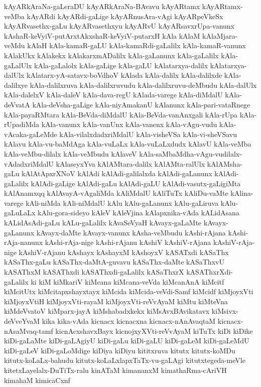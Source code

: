 {kAyARkAraNa-gaLeraDU
kAyARkAraNa-BAvavu
kAyARtamx
kAyARtamx-veMba
kAyARdi
kAyARdi-gaLige
kAyARnusAra-vAgi
kAyARpeVkeSx
kAyARvasethx-gaLu
kAyARvasethxyu
kAyARvU
kAyARsavxrUpa-vanunx
kAshaR-keVyiV-putArxtAkxshaR-keVyiV-putarxH
kAla
kAlaM
kAlaMjara-veMdu
kAlaH
kAla-kamaR-gaLU
kAla-kamaRdi-gaLalilx
kAla-kamaR-vanunx
kAlakUkx
kAlakekx
kAlakarxmADalilx
kAla-gaLanunx
kAla-gaLalilx
kAla-gaLalUlx
kAla-gaLalolx
kAla-gaLige
kAla-gaLU
kAlatarxya-dalilx
kAlatarxya-dalUlx
kAlatarx-yA-satavx-boVdhoV
kAlada
kAla-dalilx
kAla-dalilxde
kAla-dalilxye
kAla-dalilxruva
kAla-dalilxruvudu
kAla-dalilxruvu-deMbudu
kAla-dalUlx
kAla-dalelxV
kAla-daleV
kAla-dava-regU
kAlada-varege
kAla-diMdalU
kAla-deVvatA
kAla-deVsha-gaLige
kAla-niyAmakanU
kAlanunx
kAla-pari-vataRnege
kAla-payaRMtara
kAla-BeVda-diMdalU
kAla-BeVda-vanAnxgali
kAla-rUpa
kAla-rUpadiMda
kAla-vanunx
kAla-vanUnx
kAla-vanenx
kAla-vAgu-vudu
kAla-vAcaka-gaLeMde
kAla-vilalxdadxriMdalU
kAla-visheVSa
kAla-vi-sheVSavu
kAlavu
kAla-vu-baMdAga
kAla-vuLaLx
kAla-vuLaLxdudx
kAlavU
kAla-veMba
kAla-veMbu-dilalx
kAla-veMbudu
kAlaveV
kAla-saMbaMdha-vAgu-vudilalx-vAdadxriMdalU
kAlaseyxYva
kAlAMtara-dalilx
kAlAMta-ralUlx
kAlAMsha-gaLu
kAlAtApxrXNoV
kAlAdi
kAlAdi-galilalxda
kAlAdi-gaLanunx
kAlAdi-gaLalilx
kAlAdi-gaLige
kAlAdi-gaLu
kAlAdi-gaLU
kAlAdi-vasutx-gaLigiMta
kAlAnamxqq
kAlAvayA-vAgaliMda
kAliMdalU
kAliTuTx
kAliDu-vaMte
kAlina-varege
kAli-niMda
kAli-niMdalU
kAlu
kAlu-gaLanunx
kAlu-gaLiruva
kAlu-gaLuLaLx
kAlu-gora-sideyo
kAleV
kAleVjina
kAlapxnika-vAda
kALidAsana
kALidAsAdi-gaLu
kALu-gaLalilx
kAvaSeVyaH
kAvayx-gaLaMte
kAvayx-gaLanunx
kAvayx-daMte
kAvayx-vanunx
kAsha-veMbudu
kAshi-rAjana
kAshi-rAja-nanunx
kAshi-rAja-nige
kAshi-rAjanu
kAshiV
kAshiV-rAjana
kAshiV-rAja-nige
kAshiV-rAjanu
kAshayx
kAshayxM
kAshoyxV
kASATxdi
kASaThx
kASaThx-gaLu
kASaThx-daMtA-guvavu
kASaThx-daMte
kASaThxvU
kASAThxM
kASAThxdi
kASAThxdi-gaLalilx
kASaThxrX
kASAThxrXdi-gaLalilx
ki
kiM
kiMkariV
kiMcana
kiMcana-veVda
kiMcanAnA
kiMcitf
kiMcitUtx
kiMcitapxshayxtayx
kiMcida
kiMcida-veVdi-Samf
kiMcidf
kiMjoyxVti
kiMjoyxVtiH
kiMjoyxVti-rayaM
kiMjoyxVti-reVvAyaM
kiMtu
kiMteVna
kiMdeVvatoV
kiMparx-jayA
kiMshabadxkekx
kiMsAvxBAvikatavx
kiMsivx-deVveYvaM
kika
kika-vAda
kicnacx
kicnacxna
kicnacx-nAnAvaqtaM
kicnacx-nAsaMvaq-tamf
kicnAcxshavxBayx
kicnojxyXVti-reVvAyaM
kiTuTx
kiDi
kiDike
kiDi-gaLaMte
kiDi-gaLAgiyU
kiDi-gaLu
kiDi-gaLU
kiDi-gaLeM
kiDi-gaLeMdU
kiDi-gaLeV
kiDi-gaLoMdige
kiDiya
kiDiyu
kititxruva
kitutx
kitutx-koMDu
kitutx-koLaLx-bahudu
kitutx-koLaLxlapxTaTx-vu-gaLAgi
kitutxtegeda-meVle
kitetxLayelalx-DuTiTx-ralu
kinATaM
kimananxM
kimathaRma-cAriVH
kimahaM
kimicaCxnf
}
